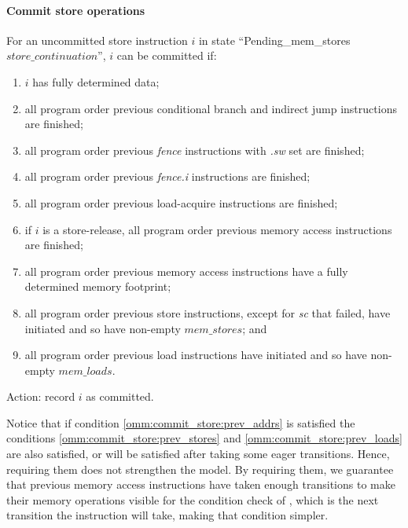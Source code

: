 \paragraph{Commit store operations}\label{omm:commit_stores}
For an uncommitted store instruction $i$ in state ``{\sc Pending\_mem\_stores} $store\_continuation$'', $i$ can be committed if:
\begin{enumerate}
\item $i$ has fully determined data;
\item all program order previous conditional branch and indirect jump instructions are finished;
\item all program order previous {\em fence} instructions with {\em .sw} set are finished;
\item all program order previous {\em fence.i} instructions are finished; 
\item all program order previous load-acquire instructions are finished;
\item  if $i$ is a store-release, all program order previous memory access instructions are finished;
\item\label{omm:commit_store:prev_addrs} all program order previous memory access instructions have a fully determined memory footprint;
\item\label{omm:commit_store:prev_stores} all program order previous store instructions, except for {\em sc} that failed, have initiated and so have non-empty $mem\_stores$; and
\item\label{omm:commit_store:prev_loads} all program order previous load instructions have initiated and so have non-empty $mem\_loads$.
\end{enumerate}
Action: record $i$ as committed.

\begin{commentary}
Notice that if condition \ref{omm:commit_store:prev_addrs} is satisfied the conditions \ref{omm:commit_store:prev_stores} and \ref{omm:commit_store:prev_loads} are also satisfied, or will be satisfied after taking some eager transitions.
Hence, requiring them does not strengthen the model.
By requiring them, we guarantee that previous memory access instructions have taken enough transitions to make their memory operations visible for the condition check of , which is the next transition the instruction will take, making that condition simpler.
\end{commentary}


